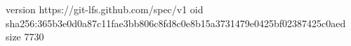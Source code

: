version https://git-lfs.github.com/spec/v1
oid sha256:365b3e0d0a87c11fae3bb806c8fd8c0e8b15a3731479e0425bf02387425c0aed
size 7730

